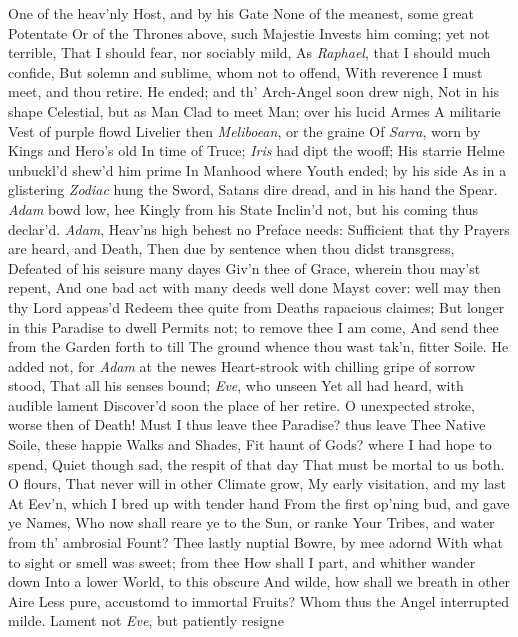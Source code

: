 \documentclass[11pt]{book}
\newcounter {first}
\newcounter {last}
\begin{document}
One of the heav'nly Host, and by his Gate 
None of the meanest, some great Potentate 
Or of the Thrones above, such Majestie 
Invests him coming; yet not terrible, 
That I should fear, nor sociably mild, 
As \textit{Raphael}, that I should much confide, 
But solemn and sublime, whom not to offend, 
With reverence I must meet, and thou retire. 
He ended; and th' Arch-Angel soon drew nigh, 
Not in his shape Celestial, but as Man 
Clad to meet Man; over his lucid Armes 
A militarie Vest of purple flowd 
Livelier then \textit{Meliboean}, or the graine 
Of \textit{Sarra}, worn by Kings and Hero's old 
In time of Truce; \textit{Iris} had dipt the wooff; 
His starrie Helme unbuckl'd shew'd him prime 
In Manhood where Youth ended; by his side 
As in a glistering \textit{Zodiac} hung the Sword, 
Satans dire dread, and in his hand the Spear. 
\textit{Adam} bowd low, hee Kingly from his State 
Inclin'd not, but his coming thus declar'd. 
\quad \textit{Adam}, Heav'ns high behest no Preface needs: 
Sufficient that thy Prayers are heard, and Death, 
Then due by sentence when thou didst transgress, 
Defeated of his seisure many dayes 
Giv'n thee of Grace, wherein thou may'st repent, 
And one bad act with many deeds well done 
Mayst cover: well may then thy Lord appeas'd 
Redeem thee quite from Deaths rapacious claimes; 
But longer in this Paradise to dwell 
Permits not; to remove thee I am come, 
And send thee from the Garden forth to till 
The ground whence thou wast tak'n, fitter Soile. 
\quad He added not, for \textit{Adam} at the newes 
Heart-strook with chilling gripe of sorrow stood, 
That all his senses bound; \textit{Eve}, who unseen 
Yet all had heard, with audible lament 
Discover'd soon the place of her retire. 
\quad O unexpected stroke, worse then of Death! 
Must I thus leave thee Paradise? thus leave 
Thee Native Soile, these happie Walks and Shades, 
Fit haunt of Gods? where I had hope to spend, 
Quiet though sad, the respit of that day 
That must be mortal to us both.  O flours, 
That never will in other Climate grow, 
My early visitation, and my last 
At Eev'n, which I bred up with tender hand 
From the first op'ning bud, and gave ye Names, 
Who now shall reare ye to the Sun, or ranke 
Your Tribes, and water from th' ambrosial Fount? 
Thee lastly nuptial Bowre, by mee adornd 
With what to sight or smell was sweet; from thee 
How shall I part, and whither wander down 
Into a lower World, to this obscure 
And wilde, how shall we breath in other Aire 
Less pure, accustomd to immortal Fruits? 
\quad Whom thus the Angel interrupted milde. 
Lament not \textit{Eve}, but patiently resigne 
\end{document}
